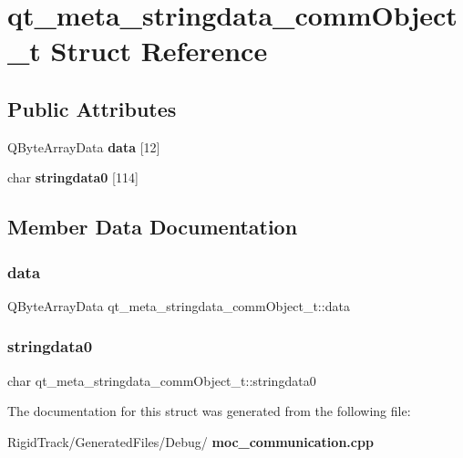 \section{qt\+\_\+meta\+\_\+stringdata\+\_\+comm\+Object\+\_\+t Struct Reference}
\label{structqt__meta__stringdata__comm_object__t}
\subsection*{Public Attributes}
\begin{DoxyCompactItemize}
\item 
Q\+Byte\+Array\+Data \textbf{ data} [12]
\item 
char \textbf{ stringdata0} [114]
\end{DoxyCompactItemize}


\subsection{Member Data Documentation}
\mbox{\label{structqt__meta__stringdata__comm_object__t_ab43768190379f38a6c0c23931d8c16ba}} 
\subsubsection{data}
{\footnotesize\ttfamily Q\+Byte\+Array\+Data qt\+\_\+meta\+\_\+stringdata\+\_\+comm\+Object\+\_\+t\+::data}

\mbox{\label{structqt__meta__stringdata__comm_object__t_a6206d59bc929b76a102101c37f263f52}} 
\subsubsection{stringdata0}
{\footnotesize\ttfamily char qt\+\_\+meta\+\_\+stringdata\+\_\+comm\+Object\+\_\+t\+::stringdata0}



The documentation for this struct was generated from the following file\+:\begin{DoxyCompactItemize}
\item 
Rigid\+Track/\+Generated\+Files/\+Debug/\textbf{ moc\+\_\+communication.\+cpp}\end{DoxyCompactItemize}
